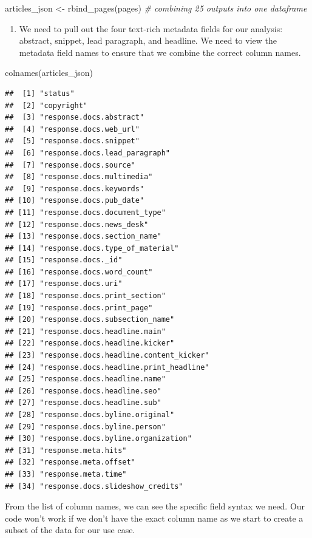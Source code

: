 \documentclass[
  krantz2]{krantz}
\makeatletter
\newenvironment{Shaded}{\begin{snugshade}}{\end{snugshade}}
\newcommand{\CommentTok}[1]{\textcolor[rgb]{0.37,0.37,0.37}{\textit{#1}}}
\newcommand{\FunctionTok}[1]{\textcolor[rgb]{0,0,0}{#1}}
\newcommand{\NormalTok}[1]{#1}
\newcommand{\OtherTok}[1]{\textcolor[rgb]{0.37,0.37,0.37}{#1}}
\providecommand{\tightlist}{%
  \setlength{\itemsep}{0pt}\setlength{\parskip}{0pt}}
\newenvironment{kframe}{%
\medskip{}
\setlength{\fboxsep}{.8em}
 \def\at@end@of@kframe{}%
 \ifinner\ifhmode%
  \def\at@end@of@kframe{\end{minipage}}%
  \begin{minipage}{\columnwidth}%
 \fi\fi%
 \def\FrameCommand##1{\hskip\@totalleftmargin \hskip-\fboxsep
 \colorbox{shadecolor}{##1}\hskip-\fboxsep
     \hskip-\linewidth \hskip-\@totalleftmargin \hskip\columnwidth}%
 \MakeFramed {\advance\hsize-\width
   \@totalleftmargin\z@ \linewidth\hsize
   \@setminipage}}%
 {\par\unskip\endMakeFramed%
 \at@end@of@kframe}
\renewenvironment{Shaded}{\begin{kframe}}{\end{kframe}}
\makeatother
\begin{document}
\begin{Shaded}
\begin{Highlighting}[]
\NormalTok{articles\_json }\OtherTok{\textless{}{-}} \FunctionTok{rbind\_pages}\NormalTok{(pages) }\CommentTok{\# combining 25 outputs into one dataframe}
\end{Highlighting}
\end{Shaded}

\begin{enumerate}
\def\labelenumi{\arabic{enumi}.}
\setcounter{enumi}{1}
\tightlist
\item
  We need to pull out the four text-rich metadata fields for our analysis: abstract, snippet, lead paragraph, and headline. We need to view the metadata field names to ensure that we combine the correct column names.
\end{enumerate}

\begin{Shaded}
\begin{Highlighting}[]
\FunctionTok{colnames}\NormalTok{(articles\_json)}
\end{Highlighting}
\end{Shaded}

\begin{verbatim}
##  [1] "status"
##  [2] "copyright"
##  [3] "response.docs.abstract"
##  [4] "response.docs.web_url"
##  [5] "response.docs.snippet"
##  [6] "response.docs.lead_paragraph"
##  [7] "response.docs.source"
##  [8] "response.docs.multimedia"
##  [9] "response.docs.keywords"
## [10] "response.docs.pub_date"
## [11] "response.docs.document_type"
## [12] "response.docs.news_desk"
## [13] "response.docs.section_name"
## [14] "response.docs.type_of_material"
## [15] "response.docs._id"
## [16] "response.docs.word_count"
## [17] "response.docs.uri"
## [18] "response.docs.print_section"
## [19] "response.docs.print_page"
## [20] "response.docs.subsection_name"
## [21] "response.docs.headline.main"
## [22] "response.docs.headline.kicker"
## [23] "response.docs.headline.content_kicker"
## [24] "response.docs.headline.print_headline"
## [25] "response.docs.headline.name"
## [26] "response.docs.headline.seo"
## [27] "response.docs.headline.sub"
## [28] "response.docs.byline.original"
## [29] "response.docs.byline.person"
## [30] "response.docs.byline.organization"
## [31] "response.meta.hits"
## [32] "response.meta.offset"
## [33] "response.meta.time"
## [34] "response.docs.slideshow_credits"
\end{verbatim}

From the list of column names, we can see the specific field syntax we need. Our code won't work if we don't have the exact column name as we start to create a subset of the data for our use case.
\end{document}
